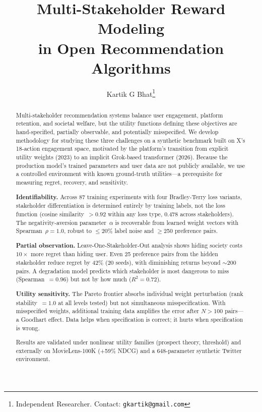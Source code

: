 \documentclass[11pt,letterpaper]{article}
\title{\textbf{Multi-Stakeholder Reward Modeling\\[2pt]
  in Open Recommendation Algorithms}}
\author{Kartik G Bhat\thanks{Independent Researcher. Contact: \texttt{gkartik@gmail.com}}}
\date{}
\begin{document}
\maketitle

\begin{abstract}\noindent
Multi-stakeholder recommendation systems balance user engagement,
platform retention, and societal welfare, but the utility functions
defining these objectives are hand-specified, partially observable, and
potentially misspecified. We develop methodology for studying
these three challenges on a synthetic benchmark built on X's
18-action engagement space, motivated by the platform's transition
from explicit utility weights (2023) to an implicit Grok-based
transformer (2026). Because the production model's trained parameters
and user data are not publicly available, we use a controlled
environment with known ground-truth utilities---a prerequisite for
measuring regret, recovery, and sensitivity.

\textbf{Identifiability.} Across 87 training experiments with four
Bradley-Terry loss variants, stakeholder differentiation is determined
entirely by training labels, not the loss function (cosine
similarity~$>0.92$ within any loss type, 0.478 across stakeholders).
The negativity-aversion parameter~$\alpha$ is recoverable from learned
weight vectors with Spearman~$\rho = 1.0$, robust to $\leq$20\%
label noise and $\geq$250 preference pairs.

\textbf{Partial observation.} Leave-One-Stakeholder-Out analysis shows
hiding society costs $10\times$ more regret than hiding user. Even 25
preference pairs from the hidden stakeholder reduce regret by 42\%
(20 seeds), with diminishing returns beyond $\sim$200 pairs. A
degradation model predicts which stakeholder is most dangerous to miss
(Spearman~$= 0.96$) but not by how much ($R^2 = 0.72$).

\textbf{Utility sensitivity.} The Pareto frontier absorbs individual
weight perturbation (rank stability~$= 1.0$ at all levels tested) but
not simultaneous misspecification. With misspecified weights,
additional training data amplifies the error after $N > 100$
pairs---a Goodhart effect. Data helps when specification is correct;
it hurts when specification is wrong.

Results are validated under nonlinear utility families (prospect theory,
threshold) and externally on MovieLens-100K (+59\% NDCG) and a
648-parameter synthetic Twitter environment.
\end{abstract}
\end{document}
